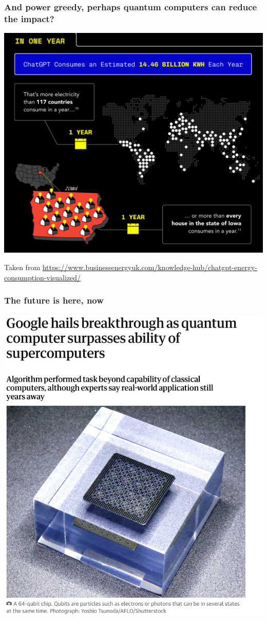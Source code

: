 \documentclass{beamer}
\begin{document}
\begin{frame}
\frametitle{And power greedy, perhaps quantum computers can reduce the impact?}

\centerline{\includegraphics[width=0.7\linewidth]{figures/aitalk1.png}}
Taken from \url{https://www.businessenergyuk.com/knowledge-hub/chatgpt-energy-consumption-visualized/}
\end{frame}



\begin{frame}
\frametitle{The future is here, now}


\centerline{\includegraphics[width=1.05\linewidth]{figures/figuregoogle.png}}

\end{frame}
\end{document}
